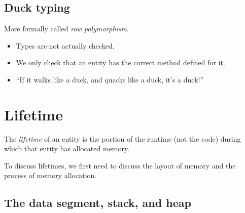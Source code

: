 \documentclass[11pt]{article}
\theoremstyle{definition}
\begin{document}
\subsection{Duck typing}
\label{sec:org7648408}

More formally called \emph{row polymorphism}.
\begin{itemize}
\item Types are not actually checked.
\item We only check that an entity has the correct method defined for it.
\item “If it walks like a duck, and quacks like a duck, it's a duck!”
\end{itemize}

\section{Lifetime}
\label{sec:orgce00318}

The \emph{lifetime} of an entity is the portion of the runtime
(not the code) during which that entity has allocated memory.

To discuss lifetimes, we first need to discuss
the layout of memory and the process of memory allocation.

\subsection{The data segment, stack, and heap}
\label{sec:org96771e8}
\end{document}
